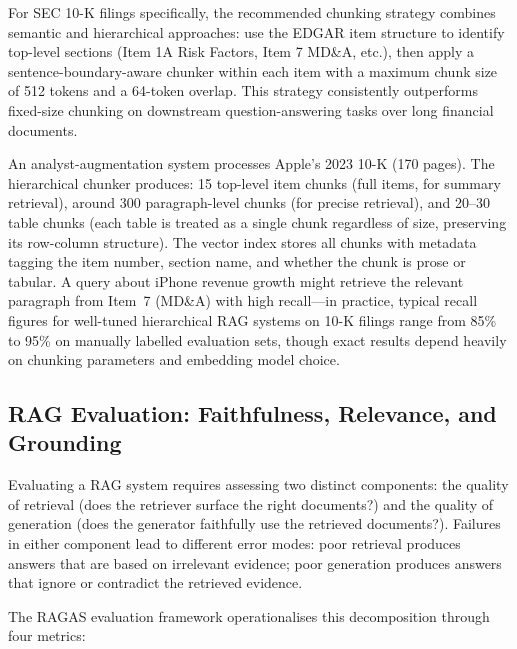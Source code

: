 \begin{deepdive}
For SEC 10-K filings specifically, the recommended chunking strategy combines semantic
and hierarchical approaches: use the EDGAR item structure to identify top-level sections
(Item 1A Risk Factors, Item 7 MD\&A, etc.), then apply a sentence-boundary-aware
chunker within each item with a maximum chunk size of 512 tokens and a 64-token overlap.
This strategy consistently outperforms fixed-size chunking on downstream question-answering tasks over long financial documents.

\begin{example}
\label{ex:chunking-10k}
An analyst-augmentation system processes Apple's 2023 10-K (170 pages). The hierarchical
chunker produces: 15 top-level item chunks (full items, for summary retrieval), around
300 paragraph-level chunks (for precise retrieval), and 20--30 table chunks (each table
is treated as a single chunk regardless of size, preserving its row-column structure).
The vector index stores all chunks with metadata tagging the item number, section name,
and whether the chunk is prose or tabular. A query about iPhone revenue growth might
retrieve the relevant paragraph from Item~7 (MD\&A) with high recall---in practice,
typical recall figures for well-tuned hierarchical RAG systems on 10-K filings range
from 85\% to 95\% on manually labelled evaluation sets, though exact results depend
heavily on chunking parameters and embedding model choice.
\end{example}


\subsection{RAG Evaluation: Faithfulness, Relevance, and Grounding}
\label{subsec:rag-eval}

Evaluating a RAG system requires assessing two distinct components: the quality of
retrieval (does the retriever surface the right documents?) and the quality of
generation (does the generator faithfully use the retrieved documents?). Failures in
either component lead to different error modes: poor retrieval produces answers that
are based on irrelevant evidence; poor generation produces answers that ignore or
contradict the retrieved evidence.

The RAGAS evaluation framework \cite{es2023ragas} operationalises this decomposition
through four metrics:


\end{deepdive}
